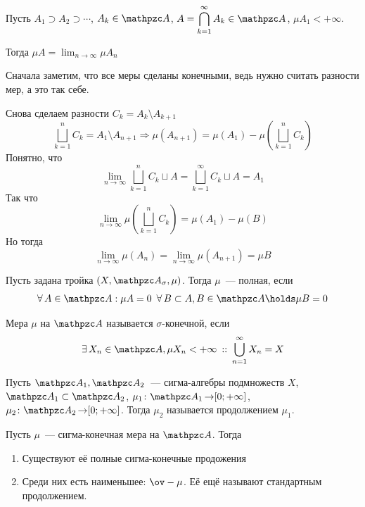 \documentclass[draft, timbord]{longnotes}
\begin{document}
\begin{prop}\label{prop:meas::meas::ucont}
  Пусть $A_1 \supset A_2 \supset \cdots$, $A_k \in \alg$, 
  $\displaystyle A = \bigcap_{k=1}^\infty A_k \in \alg$, $\mu A_1 < +\infty $.
  \par
  Тогда $\displaystyle \mu A = \lim_{n\to \infty} \mu A_n$
\end{prop}
\begin{lproof}
  Сначала заметим, что все меры сделаны конечными, ведь нужно считать разности мер, а
  это так себе.

  Снова сделаем разности $C_k = A_k \setminus A_{k+1}$
  \[
    \bigsqcup_{k=1}^n  C_k = A_1 \setminus A_{n+1} 
    \Rightarrow \mu (A_{n+1}) = \mu (A_1) - \mu \left( \bigsqcup_{k=1}^n  C_k \right)
  \]
  Понятно, что \[
    \lim_{n\to \infty} \bigsqcup_{k=1}^n  C_k \sqcup A = \bigsqcup_{k=1}^\infty  C_k \sqcup A = A_1
  \]
  Так что \[
    \lim_{n\to \infty} \mu \left( \bigsqcup_{k=1}^n  C_k \right) = \mu (A_1) - \mu (B)
  \]
  Но тогда\[
    \lim_{n\to \infty } \mu (A_n) = \lim_{n\to \infty } \mu (A_{n+1}) = \mu B
  \]
\end{lproof}


\begin{defn}\label{defn:meas::ledeg::compl}
  Пусть задана тройка $(X, \alg_\sigma, \mu)$. Тогда $\mu$~--- полная, если 
  \[
    \forall\,A \in \alg : \mu A = 0 \;\: \forall\, B \subset A, B \in \alg \holds \mu B = 0
  \]
\end{defn}

\begin{defn}\label{defn:meas::ledeg::sfin}
  Мера $\mu$  на $\alg$ называется $\sigma$-конечной, если 
  \[
    \exists\, X_n \in \alg, \mu X_n < + \infty \that \bigcup_{n=1}^\infty X_n = X
  \]
\end{defn}

\begin{defn}\label{defn:meas::ledeg::mcont}
  Пусть $\alg_1, \alg_2$~--- сигма-алгебры подмножеств $X$, $\alg_1 \subset \alg_2$,
  $\mu_1 \colon \alg_1 \to [0;+\infty] $, $\mu_2 \colon \alg_2 \to [0;+\infty]$. 
  Тогда $\mu_2$ называется продолжением $\mu_1$.
\end{defn}

\begin{thrm}\label{thrm:meas::ledeg::dist}
  Пусть $\mu$~--- сигма-конечная мера на $\alg$. Тогда
  \begin{enumerate}
    \item Существуют её полные сигма-конечные продожения
    \item Среди них есть наименьшее: $\ov-\mu$. 
      Её ещё называют стандартным продолжением.
  \end{enumerate}
\end{thrm}
\end{document}
